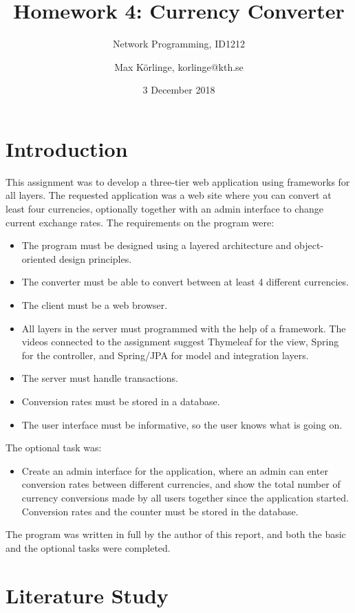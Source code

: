 \documentclass[a4paper]{scrartcl}
\title{Homework 4: Currency Converter}
\subtitle{Network Programming, ID1212}
\author{Max Körlinge, korlinge@kth.se}
\date{3 December 2018}
\begin{document}
\maketitle


\section{Introduction}

\noindent This assignment was to develop a three-tier web application using frameworks for all layers. The requested application was a web site where you can convert at least four currencies, optionally together with an admin interface to change current exchange rates. The requirements on the program were:

\begin{itemize}
    \item The program must be designed using a layered architecture and object-oriented design principles.
    \item The converter must be able to convert between at least 4 different currencies.
    \item The client must be a web browser.
    \item All layers in the server must programmed with the help of a framework. The videos connected to the assignment suggest Thymeleaf for the view, Spring for the controller, and Spring/JPA for model and integration layers.
    \item The server must handle transactions.
    \item Conversion rates must be stored in a database.
    \item The user interface must be informative, so the user knows what is going on.
\end{itemize}

The optional task was:

\begin{itemize}
    \item Create an admin interface for the application, where an admin can enter conversion rates between different currencies, and show the total number of currency conversions made by all users together since the application started. Conversion rates and the counter must be stored in the database.
\end{itemize}

The program was written in full by the author of this report, and both the basic and the optional tasks were completed.

\section{Literature Study}
\end{document}
